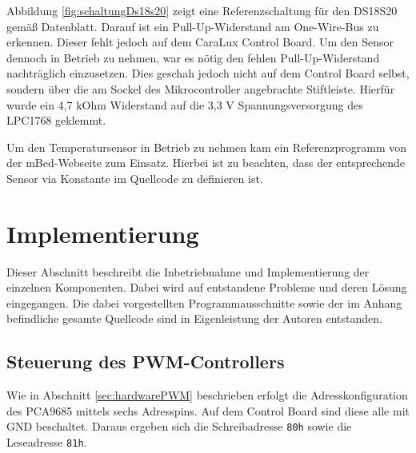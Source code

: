 \documentclass[a4paper,12pt]{scrartcl}
\begin{document}
Abbildung \ref{fig:schaltungDs18s20} zeigt eine Referenzschaltung für den DS18S20 gemäß Datenblatt. Darauf ist ein Pull-Up-Widerstand am One-Wire-Bus zu erkennen. Dieser fehlt jedoch auf dem CaraLux Control Board. Um den Sensor dennoch in Betrieb zu nehmen, war es nötig den fehlen Pull-Up-Widerstand nachträglich einzusetzen. Dies geschah jedoch nicht auf dem Control Board selbst, sondern über die am Sockel des Mikrocontroller angebrachte Stiftleiste. Hierfür wurde ein 4,7 kOhm Widerstand auf die 3,3 V Spannungsversorgung des LPC1768 geklemmt.

Um den Temperatursensor in Betrieb zu nehmen kam ein Referenzprogramm von der mBed-Webseite \cite{progds1820} zum Einsatz. Hierbei ist zu beachten, dass der entsprechende Sensor via Konstante im Quellcode zu definieren ist.

\clearpage
\section{Implementierung}
Dieser Abschnitt beschreibt die Inbetriebnahme und Implementierung der einzelnen Komponenten. Dabei wird auf entstandene Probleme und deren Lösung eingegangen. Die dabei vorgestellten Programmausschnitte sowie der im Anhang befindliche gesamte Quellcode sind in Eigenleistung der Autoren entstanden.

\subsection{Steuerung des PWM-Controllers}
Wie in Abschnitt \ref{sec:hardwarePWM} beschrieben erfolgt die Adresskonfiguration des PCA9685 mittels sechs Adresspins. Auf dem Control Board sind diese alle mit GND beschaltet. Daraus ergeben sich die Schreibadresse \texttt{80h} sowie die Leseadresse \texttt{81h}.
\end{document}
